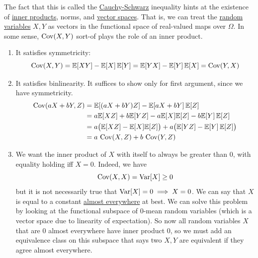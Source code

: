   The fact that this is called the \hyperref[lin-thm:cauchy-schwarz-inequality]{Cauchy-Schwarz} inequality hints at the existence of \hyperref[lin-def:inner-product]{inner products}, norms, and \hyperref[lin-def:vector-space]{vector spaces}. That is, we can treat the \hyperref[def:random-variable]{random variables} $X, Y$ as vectors in the functional space of real-valued maps over $\Omega$. In some sense, $\operatorname{Cov}(X, Y)$ sort-of plays the role of an inner product. 
  \begin{enumerate}
    \item It satisfies symmetricity: 
    \begin{equation}
      \operatorname{Cov}(X, Y) = \mathbb{E}[X Y] - \mathbb{E}[X] \, \mathbb{E}[Y] =  \mathbb{E}[Y X] - \mathbb{E}[Y] \, \mathbb{E}[X] = \operatorname{Cov}(Y, X)
    \end{equation}
    
    \item It satisfies binlinearity. It suffices to show only for first argument, since we have symmetricity. 
    \begin{align*}
      \operatorname{Cov}(aX + bY, Z) & = \mathbb{E}[(a X + b Y) Z] - \mathbb{E}[a X + b Y] \, \mathbb{E}[Z] \\
      & = a \mathbb{E}[X Z] + b \mathbb{E}[Y Z] - a \mathbb{E}[X] \mathbb{E}[Z] - b \mathbb{E}[Y] \, \mathbb{E}[Z] \\
      & = a \big( \mathbb{E}[X Z] - \mathbb{E}[X] \mathbb{E}[Z] \big) + a \big( \mathbb{E}[Y Z] - \mathbb{E}[Y] \, \mathbb{E}[Z] \big) \\
      & = a \, \operatorname{Cov}(X, Z) + b \, \operatorname{Cov}(Y, Z)
    \end{align*}

    \item We want the inner product of $X$ with itself to always be greater than $0$, with equality holding iff $X = 0$. Indeed, we have 
    \begin{equation}
      \operatorname{Cov}(X, X) = \operatorname{Var}[X] \geq 0
    \end{equation}
    but it is not necessarily true that $\operatorname{Var}[X] = 0 \implies X = 0$. We can say that $X$ is equal to a constant \hyperref[mt-def:almost_everywhere]{almost everywhere} at best. We can solve this problem by looking at the functional subspace of $0$-mean random variables (which is a vector space due to linearity of expectation). So now all random variables $X$ that are $0$ almost everywhere have inner product $0$, so we must add an equivalence class on this subspace that says two $X, Y$ are equivalent if they agree almost everywhere. 
  \end{enumerate}


